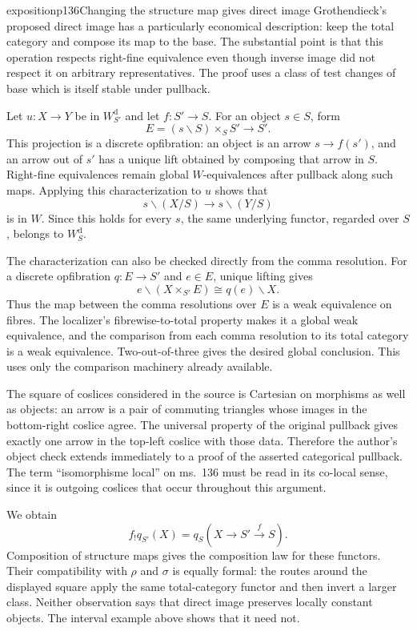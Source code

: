 \begin{dcomment}{exposition}{p136}{Changing the structure map gives direct image}
Grothendieck's proposed direct image has a particularly economical description: keep the total category and compose its map to the base. The substantial point is that this operation respects right-fine equivalence even though inverse image did not respect it on arbitrary representatives. The proof uses a class of test changes of base which is itself stable under pullback.

Let $u:X\to Y$ be in $W_{S'}^{\mathrm d}$ and let $f:S'\to S$. For an object $s\in S$, form
\[
 E=(s\backslash S)\times_S S'\longrightarrow S'.
\]
This projection is a discrete opfibration: an object is an arrow $s\to f(s')$, and an arrow out of $s'$ has a unique lift obtained by composing that arrow in $S$. Right-fine equivalences remain global $W$-equivalences after pullback along such maps. Applying this characterization to $u$ shows that
\[
 s\backslash(X/S)\longrightarrow s\backslash(Y/S)
\]
is in $W$. Since this holds for every $s$, the same underlying functor, regarded over $S$, belongs to $W_S^{\mathrm d}$.

The characterization can also be checked directly from the comma resolution. For a discrete opfibration $q:E\to S'$ and $e\in E$, unique lifting gives
\[
 e\backslash(X\times_{S'}E)\cong q(e)\backslash X.
\]
Thus the map between the comma resolutions over $E$ is a weak equivalence on fibres. The localizer's fibrewise-to-total property makes it a global weak equivalence, and the comparison from each comma resolution to its total category is a weak equivalence. Two-out-of-three gives the desired global conclusion. This uses only the comparison machinery already available.

The square of coslices considered in the source is Cartesian on morphisms as well as objects: an arrow is a pair of commuting triangles whose images in the bottom-right coslice agree. The universal property of the original pullback gives exactly one arrow in the top-left coslice with those data. Therefore the author's object check extends immediately to a proof of the asserted categorical pullback. The term ``isomorphisme local'' on ms.~136 must be read in its co-local sense, since it is outgoing coslices that occur throughout this argument.

We obtain
\[
 f_!q_{S'}(X)=q_S(X\xrightarrow{}S'\xrightarrow{f}S).
\]
Composition of structure maps gives the composition law for these functors. Their compatibility with $\rho$ and $\sigma$ is equally formal: the routes around the displayed square apply the same total-category functor and then invert a larger class. Neither observation says that direct image preserves locally constant objects. The interval example above shows that it need not.
\end{dcomment}

